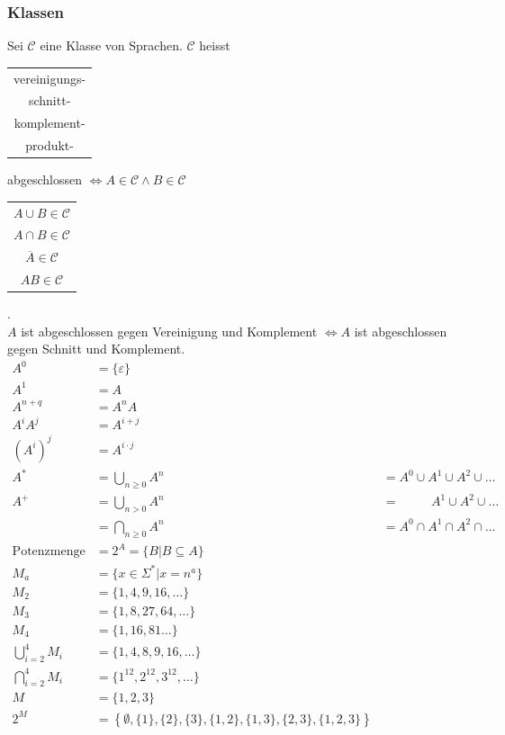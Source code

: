 \documentclass{scrartcl}
\begin{document}
\subsubsection*{Klassen}
Sei $\mathcal{C}$ eine Klasse von Sprachen. $\mathcal{C}$ heisst
\begin{tabular}[t]{|c|}
vereinigungs- \\
schnitt- \\
komplement- \\
produkt-
\end{tabular}
abgeschlossen $\Leftrightarrow A\in\mathcal{C} \wedge B\in\mathcal{C}$
\begin{tabular}[t]{|c|}
$A\cup B \in \mathcal{C}$ \\
$A\cap B \in \mathcal{C}$ \\
$\overline{A} \in \mathcal{C}$ \\
$AB \in \mathcal{C}$
\end{tabular}. \\
$A$ ist abgeschlossen gegen Vereinigung und Komplement $\Leftrightarrow A$ ist abgeschlossen gegen Schnitt und Komplement.
\begin{align*}
    A^0 &= \{\varepsilon\} \\
    A^1 &= A\\
    A^{n+q} &= A^nA\\
    A^i A^j &= A^{i+j}\\
    \left( A^i \right)^j &= A^{i \cdot j}\\
    A^* &= \underset{n\geq0}{\bigcup}A^n &= A^0\cup A^1\cup A^2\cup\dots \\
    A^+ &= \underset{n > 0}{\bigcup}A^n &= \phantom{A^0\cup\;}A^1\cup A^2\cup\dots \\
        &= \underset{n\geq0}{\bigcap}A^n &= A^0\cap A^1\cap A^2\cap\dots \\
    \textrm{Potenzmenge} &= 2^A = \{B | B\subseteq A\} \\
    M_a &= \{x\in\Sigma^* | x=n^a\} \\
    M_2 &= \{1,4,9,16,\dots\} \\
    M_3 &= \{1,8,27,64,\dots\} \\
    M_4 &= \{1,16,81\dots\} \\
    \bigcup^4_{i=2}M_i &= \{1,4,8,9,16,\dots\} \\
    \bigcap^4_{i=2}M_i &= \{1^12,2^12,3^12,\dots\} \\
    M &= \{1,2,3\} \\
    2^M &= \left\{\emptyset, \{1\}, \{2\}, \{3\}, \{1,2\}, \{1,3\}, \{2,3\}, \{1,2,3\} \right\}
\end{align*}
\end{document}
